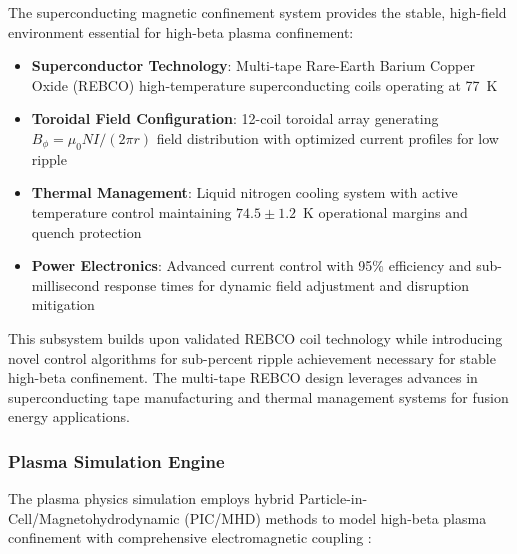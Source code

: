 \documentclass[10pt,twocolumn]{article}
\begin{document}
The superconducting magnetic confinement system provides the stable, high-field environment essential for high-beta plasma confinement:

\begin{itemize}
\item \textbf{Superconductor Technology}: Multi-tape Rare-Earth Barium Copper Oxide (REBCO) high-temperature superconducting coils operating at 77~K
\item \textbf{Toroidal Field Configuration}: 12-coil toroidal array generating $B_\phi = \mu_0 NI/(2\pi r)$ field distribution with optimized current profiles for low ripple
\item \textbf{Thermal Management}: Liquid nitrogen cooling system with active temperature control maintaining $74.5 \pm 1.2$~K operational margins and quench protection
\item \textbf{Power Electronics}: Advanced current control with 95\% efficiency and sub-millisecond response times for dynamic field adjustment and disruption mitigation
\end{itemize}

This subsystem builds upon validated REBCO coil technology \cite{senatore2014progress} while introducing novel control algorithms for sub-percent ripple achievement necessary for stable high-beta confinement. The multi-tape REBCO design leverages advances in superconducting tape manufacturing and thermal management systems \cite{freidberg2014plasma} for fusion energy applications.

\subsubsection{Plasma Simulation Engine}

The plasma physics simulation employs hybrid Particle-in-Cell/Magnetohydrodynamic (PIC/MHD) methods to model high-beta plasma confinement with comprehensive electromagnetic coupling \cite{freidberg2014plasma}:
\end{document}
